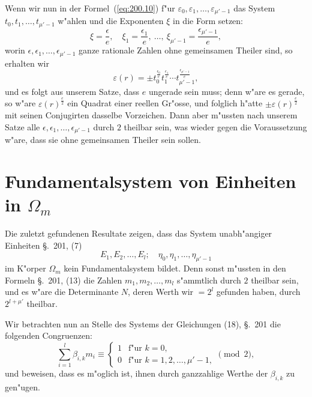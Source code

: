 \documentclass[10pt,a4paper]{article}
\theoremstyle{weberstyle}
\begin{document}
Wenn wir nun in der Formel~(\ref{eq:200.10}) f"ur
$\varepsilon_0,\varepsilon_1,\dots,\varepsilon_{\mu'-1}$ das System
$t_0,t_1,\dots,t_{\mu'-1}$ w"ahlen und die Exponenten $\xi$ in die Form
setzen:
\[
\xi=\frac{\epsilon}{e},\quad \xi_1=\frac{\epsilon_1}{e},\ \dots,\
\xi_{\mu'-1}=\frac{\epsilon_{\mu'-1}}{e},
\]
worin $\epsilon,\epsilon_1,\dots,\epsilon_{\mu'-1}$ ganze rationale Zahlen ohne
gemeinsamen Theiler sind, so erhalten wir
\begin{equation}\label{eq:200.19}
\varepsilon(r) = \pm t_0^{\frac{\epsilon_0}{e}} t_1^{\frac{\epsilon_1}{e}}
\cdots t_{\mu'-1}^{\frac{\epsilon_{\mu'-1}}{e}},
\end{equation}
und es folgt aus unserem Satze, dass $e$ ungerade sein muss; denn w"are es
gerade, so w"are $\varepsilon(r)^{\frac{e}{2}}$ ein Quadrat einer reellen Gr"osse, und
folglich h"atte $\pm\varepsilon(r)^{\frac{e}{2}}$ mit seinen Conjugirten dasselbe
Vorzeichen. Dann aber m"ussten nach unserem Satze alle
$\epsilon,\epsilon_1,\dots,\epsilon_{\mu'-1}$ durch $2$ theilbar sein, was wieder gegen die
Voraussetzung w"are, dass sie ohne gemeinsamen Theiler sein sollen.

\newpage

%
%
\section{Fundamentalsystem von Einheiten in $\Omega_m$}\label{sec:201}

Die zuletzt gefundenen Resultate zeigen, dass das System unabh"angiger
Einheiten \S.~201, (7)
\[
E_1,E_2,\dots,E_l;\quad \eta_0,\eta_1,\dots,\eta_{\mu'-1}
\]
im K"orper $\Omega_m$ kein Fundamentalsystem bildet. Denn sonst m"ussten in
den Formeln \S.~201, (13) die Zahlen $m_1,m_2,\dots,m_l$ s"ammtlich durch
$2$ theilbar sein, und es w"are die Determinante $N$, deren Werth wir $=2^{l}$
gefunden haben, durch $2^{l+\mu'}$ theilbar.

Wir betrachten nun an Stelle des Systems der Gleichungen (18), \S.~201 die
folgenden Congruenzen:
\begin{equation}\label{eq:201.1}
\sum_{i=1}^{l}\beta_{i,k}m_i \equiv
\begin{cases}
1 & \text{f"ur }k=0,\\
0 & \text{f"ur }k=1,2,\dots,\mu'-1,
\end{cases}
\pmod{2},
\end{equation}
und beweisen, dass es m"oglich ist, ihnen durch ganzzahlige Werthe der
$\beta_{i,k}$ zu gen"ugen.
\end{document}
